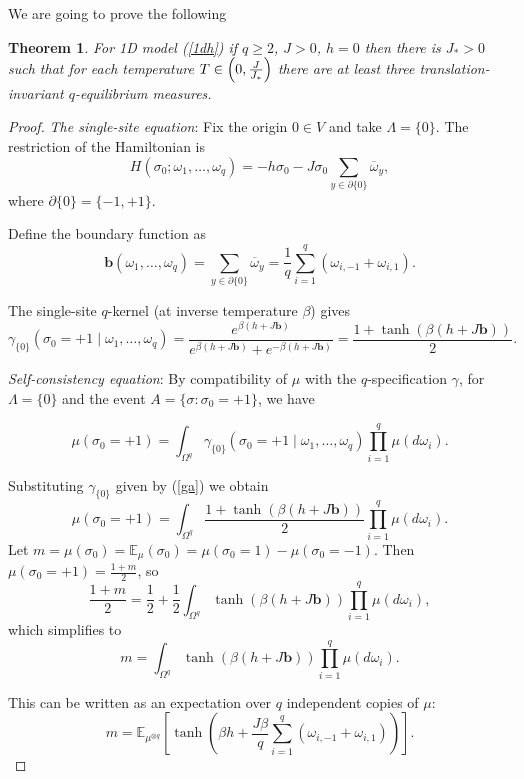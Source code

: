 \documentclass[11pt,reqno]{amsart}
\newtheorem{thm}{Theorem}
\numberwithin{equation}{section} \setcounter{tocdepth}{1}
\begin{document}
 We are going to prove the following 
\begin{thm}\label{tt3} For 1D model (\ref{1dh}) if $q\geq 2$, $J>0$, $h=0$ then there is $J_*>0$ such that for each temperature $T \in \left(0, {J\over J_*}\right)$ there are at least three translation-invariant $q$-equilibrium measures.
\end{thm}
\begin{proof} 
{\it The single-site equation}:   Fix the origin $0 \in V$ and take $\Lambda = \{0\}$.
The restriction of the Hamiltonian is
$$
H(\sigma_0; \omega_1, \dots, \omega_q) = -h \sigma_0 - J \sigma_0 \sum_{y \in \partial\{0\}} \overline{\omega}_y,
$$
where $ \partial\{0\} = \{-1, +1\} $. 

Define the boundary function as
$$
\mathbf{b}(\omega_1, \dots, \omega_q) = \sum_{y \in \partial\{0\}} \overline{\omega}_y = \frac{1}{q} \sum_{i=1}^q (\omega_{i,-1} + \omega_{i,1}).
$$

The single-site $ q $-kernel (at inverse temperature $ \beta $) gives 
\begin{equation}\label{ga}
\gamma_{\{0\}}(\sigma_0 = +1 \mid \omega_1, \dots, \omega_q) = \frac{e^{\beta(h + J \mathbf{b})}}{e^{\beta(h + J \mathbf{b})} + e^{-\beta(h + J \mathbf{b})}} = \frac{1 + \tanh(\beta(h + J \mathbf{b}))}{2}.
\end{equation}

{\it Self-consistency equation}:
By compatibility of $\mu$ with the $ q $-specification $ \gamma $, for $ \Lambda = \{0\} $ and the event $ A = \{\sigma : \sigma_0 = +1\} $, we have

$$
\mu(\sigma_0 = +1) = \int_{\Omega^q} \gamma_{\{0\}}(\sigma_0 = +1 \mid \omega_1, \dots, \omega_q) \prod_{i=1}^q \mu(d\omega_i).
$$

Substituting $\gamma_{\{0\}}$ given by (\ref{ga}) we obtain
$$
\mu(\sigma_0 = +1) = \int_{\Omega^q} \frac{1 + \tanh(\beta(h + J \mathbf{b}))}{2} \prod_{i=1}^q \mu(d\omega_i).
$$
Let $ m = \mu(\sigma_0) =\mathbb E_\mu(\sigma_0)=\mu(\sigma_0=1)-\mu(\sigma_0=-1)$. Then $ \mu(\sigma_0 = +1) = \frac{1 + m}{2} $, so
$$
\frac{1 + m}{2} = \frac{1}{2} + \frac{1}{2} \int_{\Omega^q} \tanh(\beta(h + J \mathbf{b})) \prod_{i=1}^q \mu(d\omega_i),
$$
which simplifies to
$$
m = \int_{\Omega^q} \tanh(\beta(h + J \mathbf{b})) \prod_{i=1}^q \mu(d\omega_i). 
$$

This can be written as an expectation over $q$ independent copies of $\mu$:
\begin{equation}\label{Eq}
m = \mathbb{E}_{\mu^{\otimes q}} \left[ \tanh\left( \beta h + \frac{J\beta}{q} \sum_{i=1}^q (\omega_{i,-1} + \omega_{i,1}) \right) \right].
\end{equation}


\end{proof}
\end{document}
